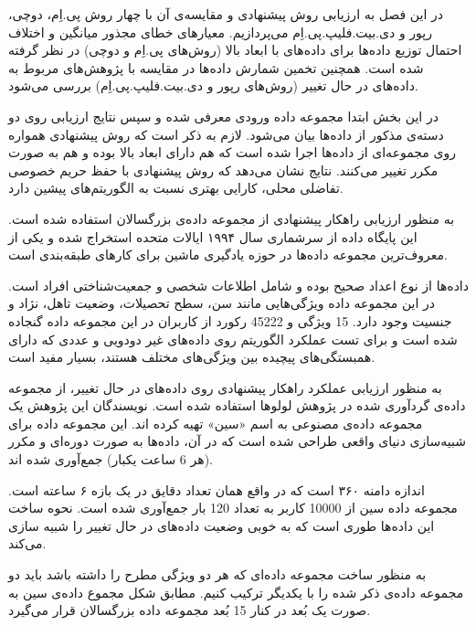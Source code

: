 

در این فصل به ارزیابی روش پیشنهادی و مقایسه‌ی آن با چهار روش پی.اِم، دوچی، رپور و دی.بیت.فلیپ.پی.اِم می‌پردازیم. معیارهای خطای مجذور میانگین و اختلاف احتمال توزیع داده‌ها برای داده‌های با ابعاد بالا (روش‌های پی.اِم و دوچی) در نظر گرفته شده است. همچنین تخمین شمارش داده‌ها در مقایسه با پژوهش‌های مربوط به داده‌های در حال تغییر (روش‌های رپور و دی.بیت.فلیپ.پی.اِم) بررسی می‌شود. 

در این بخش ابتدا مجموعه داده ورودی معرفی شده و سپس نتایج ارزیابی روی دو دسته‌ی مذکور از داده‌ها بیان می‌شود. لازم به ذکر است که روش پیشنهادی همواره روی مجموعه‌ای از داده‌ها اجرا شده است که هم دارای ابعاد بالا بوده و هم به صورت مکرر تغییر می‌کنند. نتایج نشان می‌دهد که روش پیشنهادی با حفظ حریم خصوصی تفاضلی محلی، کارایی بهتری نسبت به الگوریتم‌های پیشین دارد.


 به منظور ارزیابی راهکار پیشنهادی از مجموعه داده‌ی بزرگسالان استفاده شده است. این پایگاه داده از سرشماری سال ۱۹۹۴ ایالات متحده استخراج شده و یکی از معروف‌ترین مجموعه داده‌ها در حوزه یادگیری ماشین برای کارهای طبقه‌بندی است.

داده‌ها از نوع اعداد صحیح بوده و شامل اطلاعات شخصی و جمعیت‌شناختی افراد است. در این مجموعه داده ویژگی‌هایی مانند سن، سطح تحصیلات، وضعیت تاهل، نژاد و جنسیت وجود دارد. 15 ویژگی و 45222 رکورد از کاربران در این مجموعه داده گنجاده شده است و برای تست عملکرد الگوریتم روی داده‌های غیر دودویی و عددی که دارای همبستگی‌های پیچیده بین ویژگی‌های مختلف هستند، بسیار مفید است.

به منظور ارزیابی عملکرد راهکار پیشنهادی روی داده‌های در حال تغییر، از مجموعه‌ داده‌ی گردآوری شده در پژوهش لولوها استفاده شده است. نویسندگان این پژوهش یک مجموعه داده‌ی مصنوعی به اسم «سین» تهیه کرده اند. این مجموعه داده برای شبیه‌سازی دنیای واقعی طراحی شده است که در آن، داده‌ها به صورت دوره‌ای و مکرر (هر 6 ساعت یکبار) جمع‌آوری شده اند.

اندازه دامنه ۳۶۰ است که در واقع همان تعداد دقایق در یک بازه ۶ ساعته است. مجموعه داده سین از 10000 کاربر به تعداد 120 بار جمع‌آوری شده است. نحوه ساخت این داده‌ها طوری است که به خوبی وضعیت داده‌های در حال تغییر را شبیه سازی می‌کند.

به منظور ساخت مجموعه داده‌ای که هر دو ویژگی مطرح را داشته باشد باید دو مجموعه داده‌ی ذکر شده را با یکدیگر ترکیب کنیم. مطابق شکل  مجموع داده‌ی سین به صورت یک بُعد در کنار 15 بُعد مجموعه داده بزرگسالان قرار می‌گیرد.

